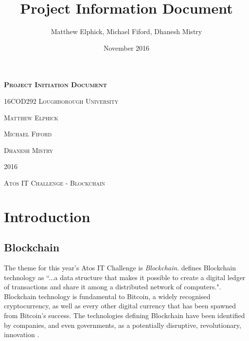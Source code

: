 \documentclass{article}
\title{Project Information Document}
\author{Matthew Elphick, Michael Fiford, Dhanesh Mistry}
\date{November 2016}
\begin{document}
\begin{titlepage}
\begin{center}
\textbf{\textsc{\Huge Project Initiation Document}}
\par
\vspace{0.5cm}
\textsc{\huge 16COD292}
\vfill
\textsc{\Huge Loughborough University}
\vspace{1cm}
\par
\textsc{\huge Matthew Elphick}
\par
\vspace{0.2cm}
\textsc{\huge Michael Fiford}
\par
\vspace{0.2cm}
\textsc{\huge Dhanesh Mistry}
\vspace{1cm}
\par
\textsc{\Huge 2016}
\end{center}
\end{titlepage}

\maketitle

\tableofcontents
\newpage

\begin{spacing}{2}
    \begin{center}
        \textsc{\huge{Atos IT Challenge - Blockchain}}
    \end{center}
\end{spacing}

\section{Introduction}


\subsection{Blockchain}

The theme for this year's Atos IT Challenge is \emph{Blockchain}. \textcite{cioblockchain} defines Blockchain technology as ``...a data structure that makes it possible to create a digital ledger of transactions and share it among a distributed network of computers.". Blockchain technology is fundamental to Bitcoin, a widely recognised cryptocurrency, as well as every other digital currency that has been spawned from Bitcoin's success. The technologies defining Blockchain have been identified by companies, and even governments, as a potentially disruptive, revolutionary, innovation \parencite{ukdlt} \parencite{nomura_research_institute_survey_2016}.
\end{document}
